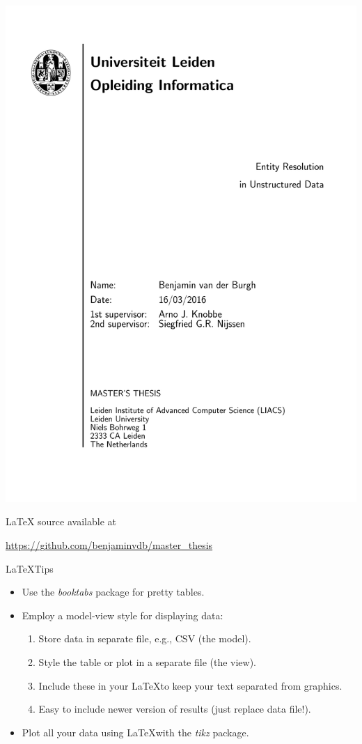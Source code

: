 \documentclass[12pt]{beamer}
\theoremstyle{break}
\begin{document}


\begin{frame}[plain]
	
	\begin{center}
		\includegraphics[page=1,width=.5\textwidth]{main.pdf}  %
		\footnotesize
		
		LaTeX source available at
		
		\url{https://github.com/benjaminvdb/master_thesis}
	\end{center}
	
\end{frame}




\begin{frame}{\LaTeX Tips}

	\begin{itemize}
		\item Use the \textit{booktabs} package for pretty tables.
		\item Employ a model-view style for displaying data: \begin{enumerate}
 			\item Store data in separate file, e.g., CSV (the model).
 			\item Style the 	table or plot in a separate file (the view).
 			\item Include these in your \LaTeX to keep your text separated from graphics.
 			\item Easy to include newer version of results (just replace data file!).
 			\end{enumerate}
 		\item Plot all your data using \LaTeX with the \textit{tikz} package.
	\end{itemize}

\end{frame}
\end{document}

